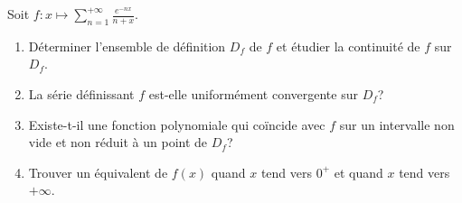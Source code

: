 \begin{enonce}
\begin{exercise}[ID={RMS126 E775},subtitle={Centrale PSI 2015},tags={}]
Soit $f:x\mapsto \sum_{n=1}^{+\infty} \frac{e^{-nx}}{n+x}$.
\begin{enumerate}
  \item Déterminer l'ensemble de définition $D_f$ de $f$ et étudier la continuité de $f$ sur $D_f$.
  \item La série définissant $f$ est-elle uniformément convergente sur $D_f$?
  \item Existe-t-il une fonction polynomiale qui coïncide avec $f$ sur un intervalle non vide et non réduit à un point de $D_f$?
  \item Trouver un équivalent de $f(x)$ quand $x$ tend vers $0^+$ et quand $x$ tend vers $+\infty$.
\end{enumerate}
\end{exercise}
\begin{solution}
\end{solution}
\end{enonce}
